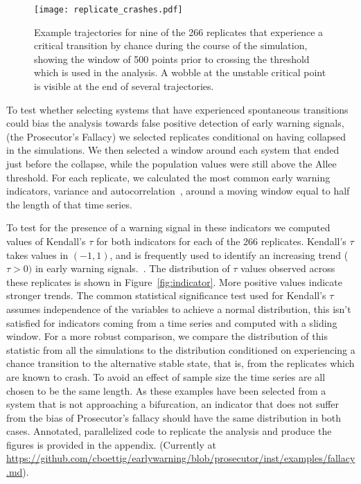 \documentclass[authoryear,review,12pt]{elsarticle}
\begin{document}
  \begin{figure}
    \begin{center}
      \texttt{[image: replicate\_crashes.pdf]}
    \end{center}
    \caption{Example trajectories for nine of the 266 replicates that 
             experience a critical transition by chance during the course
             of the simulation, showing the window of 500 points prior to
             crossing the threshold which is used in the analysis.  A wobble
             at the unstable critical point is visible at the end of several 
             trajectories.}
    \label{fig:replicate_crashes}
  \end{figure}


To test whether selecting systems that have experienced spontaneous transitions
could bias the analysis towards false positive detection of early warning signals,
(the Prosecutor's Fallacy) we selected replicates conditional on having collapsed
in the simulations.
We then selected a window around each system that ended just before the
collapse, while the population values were still above the Allee threshold.
For each replicate, we calculated the most common early warning indicators, variance
and autocorrelation~\citep[\emph{e.g.}][]{Carpenter2006,Dakos2008,Scheffer2009}, 
around a moving window equal to half the length of that time series.  


To test for the presence of a warning signal in these indicators we
computed values of Kendall's $\tau$ for both indicators for each of
the 266 replicates.  Kendall's $\tau$ takes values in $(-1, 1)$, and is
frequently used to identify an increasing trend ($\tau > 0 )$ in early
warning signals.~\citep{Dakos2008, Dakos2011}.  The distribution
of $\tau$ values observed across these replicates is shown in
Figure~\ref{fig:indicator}.  More positive values indicate stronger
trends. The common statistical significance test used for Kendall's $\tau$
assumes independence of the variables to achieve a normal distribution,
this isn't satisfied for indicators coming from a time series and
computed with a sliding window.  For a more robust comparison, we
compare the distribution of this statistic from all the simulations to
the distribution conditioned on experiencing a chance transition to the
alternative stable state, that is, from the replicates which are known
to crash.  To avoid an effect of sample size the time series are all chosen
to be the same length.  As these examples have been selected from a system
that is not approaching a bifurcation, an indicator that does not suffer
from the bias of Prosecutor's fallacy should have the same distribution
in both cases.   Annotated, parallelized code to replicate the analysis
and produce the figures is provided in the appendix.  (Currently at
\href{https://github.com/cboettig/earlywarning/blob/prosecutor/inst/examples/fallacy.md}{https://github.com/cboettig/earlywarning/blob/prosecutor/inst/examples/fallacy.md}).
\end{document}
